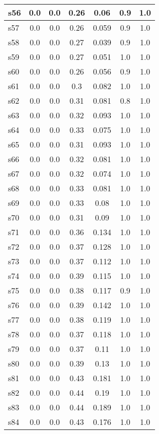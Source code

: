 \documentclass{article}
\begin{document}
\begin{tabular}{|l|c|c|c|c|c|c|}
\hline
s56 &0.0 & 0.0 & 0.26 & 0.06 & 0.9 & 1.0\\
\hline
s57 &0.0 & 0.0 & 0.26 & 0.059 & 0.9 & 1.0\\
\hline
s58 &0.0 & 0.0 & 0.27 & 0.039 & 0.9 & 1.0\\
\hline
s59 &0.0 & 0.0 & 0.27 & 0.051 & 1.0 & 1.0\\
\hline
s60 &0.0 & 0.0 & 0.26 & 0.056 & 0.9 & 1.0\\
\hline
s61 &0.0 & 0.0 & 0.3 & 0.082 & 1.0 & 1.0\\
\hline
s62 &0.0 & 0.0 & 0.31 & 0.081 & 0.8 & 1.0\\
\hline
s63 &0.0 & 0.0 & 0.32 & 0.093 & 1.0 & 1.0\\
\hline
s64 &0.0 & 0.0 & 0.33 & 0.075 & 1.0 & 1.0\\
\hline
s65 &0.0 & 0.0 & 0.31 & 0.093 & 1.0 & 1.0\\
\hline
s66 &0.0 & 0.0 & 0.32 & 0.081 & 1.0 & 1.0\\
\hline
s67 &0.0 & 0.0 & 0.32 & 0.074 & 1.0 & 1.0\\
\hline
s68 &0.0 & 0.0 & 0.33 & 0.081 & 1.0 & 1.0\\
\hline
s69 &0.0 & 0.0 & 0.33 & 0.08 & 1.0 & 1.0\\
\hline
s70 &0.0 & 0.0 & 0.31 & 0.09 & 1.0 & 1.0\\
\hline
s71 &0.0 & 0.0 & 0.36 & 0.134 & 1.0 & 1.0\\
\hline
s72 &0.0 & 0.0 & 0.37 & 0.128 & 1.0 & 1.0\\
\hline
s73 &0.0 & 0.0 & 0.37 & 0.112 & 1.0 & 1.0\\
\hline
s74 &0.0 & 0.0 & 0.39 & 0.115 & 1.0 & 1.0\\
\hline
s75 &0.0 & 0.0 & 0.38 & 0.117 & 0.9 & 1.0\\
\hline
s76 &0.0 & 0.0 & 0.39 & 0.142 & 1.0 & 1.0\\
\hline
s77 &0.0 & 0.0 & 0.38 & 0.119 & 1.0 & 1.0\\
\hline
s78 &0.0 & 0.0 & 0.37 & 0.118 & 1.0 & 1.0\\
\hline
s79 &0.0 & 0.0 & 0.37 & 0.11 & 1.0 & 1.0\\
\hline
s80 &0.0 & 0.0 & 0.39 & 0.13 & 1.0 & 1.0\\
\hline
s81 &0.0 & 0.0 & 0.43 & 0.181 & 1.0 & 1.0\\
\hline
s82 &0.0 & 0.0 & 0.44 & 0.19 & 1.0 & 1.0\\
\hline
s83 &0.0 & 0.0 & 0.44 & 0.189 & 1.0 & 1.0\\
\hline
s84 &0.0 & 0.0 & 0.43 & 0.176 & 1.0 & 1.0\\

\end{tabular}
\end{document}
